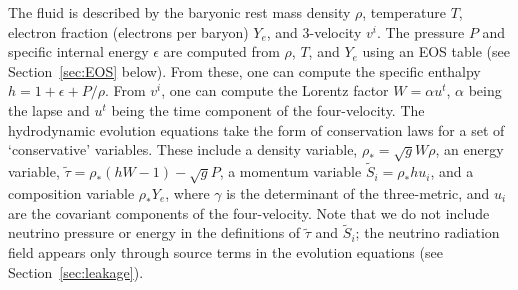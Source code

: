 The fluid is described by the baryonic rest mass density $\rho$, temperature $T$,
electron fraction (electrons per baryon) $Y_e$, and 3-velocity $v^i$.  The
pressure $P$ and specific internal energy $\epsilon$ are computed from
$\rho$, $T$, and $Y_e$ using an EOS table (see
Section~\ref{sec:EOS} below).  From these, one can compute the specific
enthalpy $h=1+\epsilon+P/\rho$.  From $v^i$, one can compute the Lorentz
factor $W=\alpha u^t$, $\alpha$ being the lapse and $u^t$ being the time
component of the four-velocity.  The hydrodynamic evolution equations take
the form of conservation laws for a set of `conservative' variables.  These
include a density variable, $\rho_*=\sqrt{g}W\rho$, an energy variable,
$\tilde\tau=\rho_*(hW-1)-\sqrt{g}P$, a momentum variable
$\tilde S_i=\rho_*hu_i$, and a composition variable $\rho_*Y_e$, where
$\gamma$ is the determinant of the three-metric, and $u_i$ are the covariant
components of the four-velocity.  Note that we do not include neutrino
pressure or energy in the definitions of $\tilde\tau$ and $\tilde S_i$;
the neutrino radiation field appears only through source terms in the
evolution equations (see Section~\ref{sec:leakage}).

